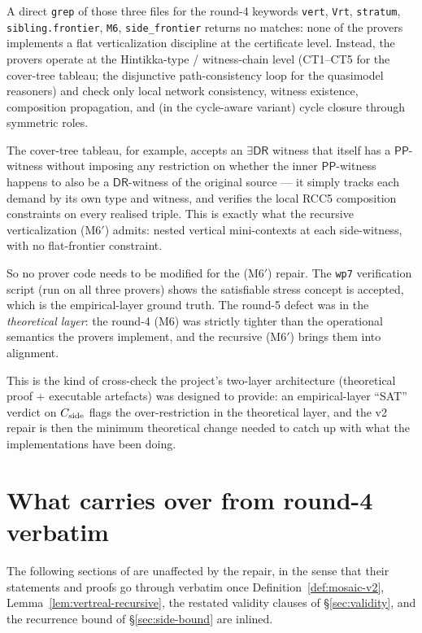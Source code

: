 \documentclass[11pt]{article}
\theoremstyle{definition}
\theoremstyle{remark}
\newcommand{\DR}{\mathsf{DR}}
\newcommand{\PP}{\mathsf{PP}}
\begin{document}
A direct \texttt{grep} of those three files for the round-4
keywords \texttt{vert}, \texttt{Vrt}, \texttt{stratum},
\texttt{sibling.frontier}, \texttt{M6}, \texttt{side\_frontier}
returns no matches: none of the provers implements a flat
verticalization discipline at the certificate level.  Instead, the
provers operate at the Hintikka-type / witness-chain level (CT1--CT5
for the cover-tree tableau; the disjunctive path-consistency loop
for the quasimodel reasoners) and check only local network
consistency, witness existence, composition propagation, and (in
the cycle-aware variant) cycle closure through symmetric roles.

The cover-tree tableau, for example, accepts an $\exists\DR$
witness that itself has a $\PP$-witness without imposing any
restriction on whether the inner $\PP$-witness happens to also be a
$\DR$-witness of the original source --- it simply tracks each
demand by its own type and witness, and verifies the local RCC5
composition constraints on every realised triple.  This is exactly
what the recursive verticalization (M6$'$) admits: nested vertical
mini-contexts at each side-witness, with no flat-frontier
constraint.

So no prover code needs to be modified for the (M6$'$) repair.  The
\texttt{wp7} verification script (run on all three provers) shows
the satisfiable stress concept is accepted, which is the
empirical-layer ground truth.  The round-5 defect was in the
\emph{theoretical layer}: the round-4 (M6) was strictly tighter
than the operational semantics the provers implement, and the
recursive (M6$'$) brings them into alignment.

This is the kind of cross-check the project's two-layer
architecture (theoretical proof + executable artefacts) was
designed to provide: an empirical-layer ``SAT'' verdict on
$C_{\rm side}$ flags the over-restriction in the theoretical layer,
and the v2 repair is then the minimum theoretical change needed to
catch up with what the implementations have been doing.

\section{What carries over from round-4 verbatim}
\label{sec:carryover}

The following sections of \cite{GPT55Repaired} are unaffected by the
repair, in the sense that their statements and proofs go through
verbatim once Definition~\ref{def:mosaic-v2}, Lemma~\ref{lem:vertreal-recursive},
the restated validity clauses of \S\ref{sec:validity}, and the
recurrence bound of \S\ref{sec:side-bound} are inlined.
\end{document}
